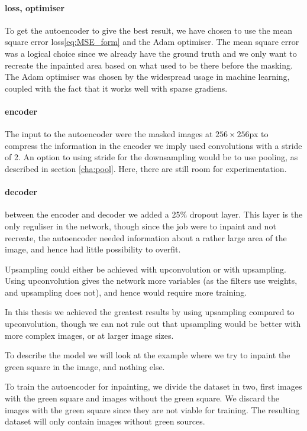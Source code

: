 \paragraph{loss, optimiser}
To get the autoencoder to give the best result, we have chosen to use the mean square error loss\ref{eq:MSE_form} and the Adam\cite{adam} optimiser.
The mean square error was a logical choice since we already have the ground truth and we only want to recreate the inpainted area based on what used to be there before the masking.
The Adam optimiser was chosen by the widespread usage in machine learning, coupled with the fact that it works well with sparse gradiens.

\paragraph{encoder}
The input to the autoencoder were the masked images at $256 \times 256$px to compress the information in the encoder we imply used convolutions with a stride of 2. An option to using stride for the downsampling would be to use pooling, as described in section \ref{cha:pool}. Here, there are still room for experimentation.



\paragraph{decoder}
between the encoder and decoder we added a 25\% dropout layer. This layer is the only reguliser in the network, though since the job were to inpaint and not recreate, the autoencoder needed information about a rather large area of the image, and hence had little possibility to overfit.

Upsampling could either be achieved with upconvolution or with upsampling.
Using upconvolution gives the network more variables (as the filters use weights, and upsampling does not), and hence would require more training. 

In this thesis we achieved the greatest results by using upsampling compared to upconvolution, though we can not rule out that upsampling would be better with more complex images, or at larger image sizes.

\vspace{5px}

To describe the model we will look at the example where we try to inpaint the green square in the image, and nothing else.

To train the autoencoder for inpainting, we divide the dataset in two, first images with the green square and images without the green square. We discard the images with the green square since they are not viable for training. 
The resulting dataset will only contain images without green sources.

